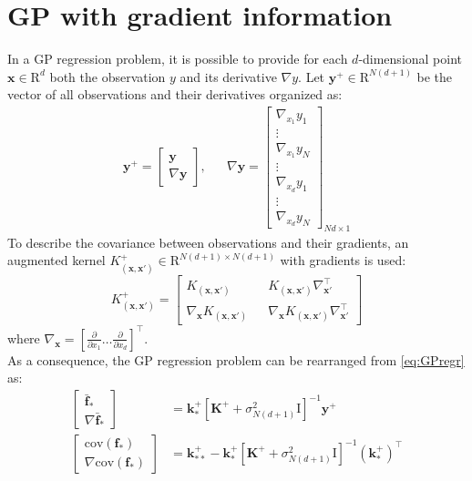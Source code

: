 \documentclass[10pt,a4paper,twocolumn]{article}
\newcommand{\trsp}{{\scriptscriptstyle\top}}
\newcommand{\cov}{\mathrm{cov}}
\begin{document}
\section{GP with gradient information}
In a GP regression problem, it is possible to provide for each $d$-dimensional point $\mathbf{x} \in \mathrm{R}^d$ both the observation $y$ and its derivative $\nabla y$. Let $\mathbf{y}^+ \in \mathrm{R}^{N(d+1)}$ be the vector of all observations and their derivatives organized as:
\begin{align}
	\mathbf{y}^+ = 
	\begin{bmatrix}
		\mathbf{y} \\
		\nabla \mathbf{y} 
	\end{bmatrix},
	&&
	\nabla \mathbf{y} =
	\begin{bmatrix}
		\nabla_{x_1} y_1 \\
		\vdots \\
		\nabla_{x_1} y_N \\
		\vdots \\
		\nabla_{x_d} y_1 \\
		\vdots \\
		\nabla_{x_d} y_N
	\end{bmatrix}_{Nd \times 1}
\end{align}
To describe the covariance between observations and their gradients, an augmented kernel $K^+_{(\mathbf{x}, \mathbf{x'})} \in \mathrm{R}^{N(d+1) \times N(d+1)}$ with gradients is used:
\begin{equation}
	K^+_{(\mathbf{x}, \mathbf{x'})} =	
	\begin{bmatrix}
		K_{(\mathbf{x}, \mathbf{x'})} && K_{(\mathbf{x}, \mathbf{x'})} \nabla_{\mathbf{x}'} ^\trsp \\
		\nabla_{\mathbf{x}} K_{(\mathbf{x}, \mathbf{x'})} && \nabla_{\mathbf{x}} K_{(\mathbf{x}, \mathbf{x'})} \nabla_{\mathbf{x}'} ^\trsp
	\end{bmatrix}
\end{equation}
where $\nabla_{\mathbf{x}} = \left[ \frac{\partial}{\partial x_1} \ldots \frac{\partial}{\partial x_d} \right]^\trsp$. \\
As a consequence, the GP regression problem can be rearranged from \autoref{eq:GPregr} as:
\begin{equation}\label{eq:GPgrad}
	\begin{aligned}
		\begin{bmatrix}
			\mathbf{\bar{f}_*} \\
			\nabla \mathbf{\bar{f}_*}
		\end{bmatrix}
		&= \mathbf{k}_*^+[\mathbf{K^+} + \sigma_{N(d+1)}^2 \mathrm{I}]^{-1}\mathbf{y^+}\\   
		\begin{bmatrix}
			\cov(\mathbf{f}_*) \\
			\nabla \cov(\mathbf{f}_*)
		\end{bmatrix} 
		&= \mathbf{k}_{**}^+ - \mathbf{k}_*^+[\mathbf{K}^+ + \sigma_{N(d+1)}^2 \mathrm{I}]^{-1} \left( \mathbf{k}_*^+ \right) ^\trsp 
	\end{aligned}
\end{equation}
\end{document}
